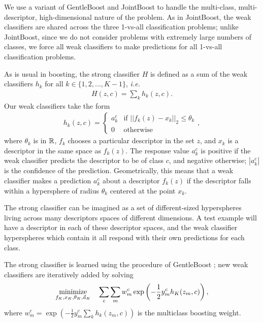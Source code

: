 \documentclass[letterpaper, 10 pt, conference]{ieeeconf}  %
\begin{document}
We use a variant of GentleBoost \cite{Friedman2000} and JointBoost \cite{Torralba2004} to handle the multi-class, multi-descriptor, high-dimensional nature of the problem.  As in JointBoost, the weak classifiers are shared across the three 1-vs-all classification problems; unlike JointBoost, since we do not consider problems with extremely large numbers of classes, we force all weak classifiers to make predictions for all 1-vs-all classification problems.

As is usual in boosting, the strong classifier $H$ is defined as a sum of the weak classifiers $h_k$ for all $k \in \{1, 2, \dots, K - 1\}$, \textit{i.e.}
\begin{align*}
  H(z, c) = \sum_k h_k(z, c).
\end{align*}
Our weak classifiers take the form
\begin{eqnarray*}
  h_k(z, c) = \begin{cases}
    a_k^c & \text{if $||f_k(z) - x_k||_2 \leq \theta_k$} \\
    0 & \text{otherwise}
  \end{cases},
\end{eqnarray*}
where $\theta_k$ is in $\mathbb{R}$, $f_k$ chooses a particular descriptor in the set $z$, and $x_k$ is a descriptor in the same space as $f_k(z)$.  The response value $a_k^c$ is positive if the weak classifier predicts the descriptor to be of class $c$, and negative otherwise; $|a_k^c|$ is the confidence of the prediction.  Geometrically, this means that a weak classifier makes a prediction $a_k^c$ about a descriptor $f_k(z)$ if the descriptor falls within a hypersphere of radius $\theta_k$ centered at the point $x_k$.  

The strong classifier can be imagined as a set of different-sized hyperspheres living across many descriptors spaces of different dimensions.  A test example will have a descriptor in each of these descriptor spaces, and the weak classifier hyperspheres which contain it all respond with their own predictions for each class.

The strong classifier is learned using the procedure of GentleBoost
\cite{Friedman2000}; new weak classifiers are iteratively added by solving
\begin{align}
  \underset{ f_K, x_K, \theta_K, \vec{a}_K}{\mbox{minimize}}\quad \sum_c \sum_m w_m^c \exp \left( -\frac{1}{2} y_m^c h_K(z_m, c) \right), \label{eqn:opt}
\end{align}
where $w_m^c = \exp(-\frac{1}{2} y_m^c \sum_k h_k(z_m, c))$ is the multiclass boosting weight.
\end{document}
